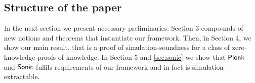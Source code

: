 \documentclass[runningheads,11pt]{llncs}
\newtheorem{lemma}[theorem]{Lemma} \newtheorem{corollary}[theorem]{Corollary}
\theoremstyle{definition} \newtheorem{definition}[theorem]{Definition}
\begin{document}





\subsection{Structure of the paper}
In the next section we present necessary preliminaries. Section 3 compounds of
new notions and theorems that instantiate our framework. Then, in Section 4, we
show our main result, that is a proof of simulation-soundness for a class of
zero-knowledge proofs of knowledge. In Section 5 and \cref{sec:sonic} we show
that $\textnormal{\textsf{Plonk}}$ and ${\textnormal{\textsf{Sonic}}}$ fulfils requirements of our framework and in fact is
simulation extractable.
\end{document}
